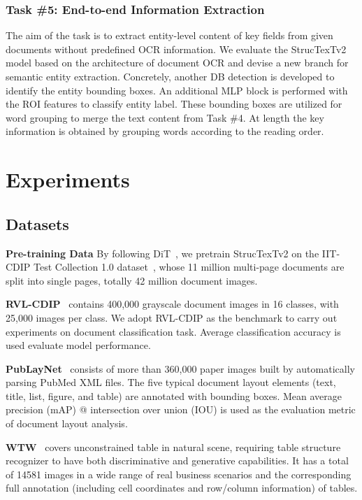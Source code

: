 \documentclass{article} \usepackage{iclr2023_conference,times}
\begin{document}
\subsubsection{Task \#5: End-to-end Information Extraction}
The aim of the task is to extract entity-level content of key fields from given documents without predefined OCR information. We evaluate the StrucTexTv2 model based on the architecture of document OCR and devise a new branch for semantic entity extraction. Concretely, another DB detection is developed to identify the entity bounding boxes. An additional MLP block is performed with the ROI features to classify entity label. These bounding boxes are utilized for word grouping to merge the text content from Task \#4. At length the key information is obtained by grouping words according to the reading order.


\section{Experiments}


\subsection{Datasets} 
\noindent\textbf{Pre-training Data} By following DiT~\cite{li2022dit}, we pretrain StrucTexTv2 on the IIT-CDIP Test Collection 1.0 dataset~\cite{sigir06cdip}, whose 11 million multi-page documents are split into single pages, totally 42 million document images. 


\noindent\textbf{RVL-CDIP}~\cite{icdar15cdip} contains 400,000 grayscale document images in 16 classes, with 25,000 images per class. 
We adopt RVL-CDIP as the benchmark to carry out experiments on document classification task. Average classification accuracy is used evaluate model performance.

\noindent\textbf{PubLayNet}~\cite{zhong2019publaynet} consists of more than 360,000 paper images built by automatically parsing PubMed XML files. The five typical document layout elements (text, title, list, figure, and table) are annotated with bounding boxes. Mean average precision (mAP) @ intersection over union (IOU) is used as the evaluation metric of document layout analysis.

\noindent\textbf{WTW}~\cite{long2021parsing} covers unconstrained table in natural scene, requiring table structure recognizer to have both discriminative and generative capabilities. It has a total of 14581 images in a wide range of real business scenarios and the corresponding full annotation (including cell coordinates and row/column information) of tables. 
\end{document}
